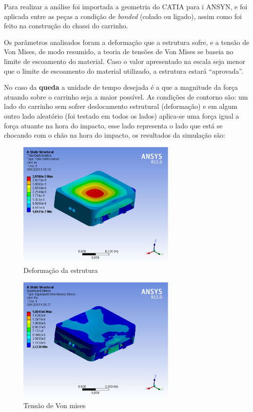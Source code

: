 Para realizar a análise foi importada a geometria do CATIA para i ANSYN, e foi aplicada entre as peças a condição de \textit{bonded}
(colado ou ligado), assim como foi feito na construção do chassi do carrinho.

Os parâmetros analisados foram a deformação que a estrutura sofre, e a tensão de Von Mises, de modo resumido, a teoria de tensões
de Von Mises se baseia no limite de escoamento do material. Caso o valor apresentado na escala seja menor que o limite de escoamento
do material utilizado, a estrutura estará “aprovada”.

No caso da \textbf{queda} a unidade de tempo desejada é a que a magnitude da força atuando sobre o carrinho seja a maior possível. As condições
de contorno são: um lado do carrinho sem sofrer deslocamento estrutural (deformação) e em algum outro lado aleatório (foi testado em todos
os lados) aplica-se uma força igual a força atuante na hora do impacto, esse lado representa o lado que está se chocando com o chão na hora
do impacto, os resultados da simulação são:

\begin{figure}[H]
    \centering
    \includegraphics[width=0.7\textwidth]{figuras/queda_deformacao.eps}
    \caption{Deformação da estrutura}
    \label{fig:queda_deformacao}
\end{figure}

\begin{figure}[H]
    \centering
    \includegraphics[width=0.7\textwidth]{figuras/queda_von.eps}
    \caption{Tensão de Von mises}
    \label{fig:queda_von}
\end{figure}

